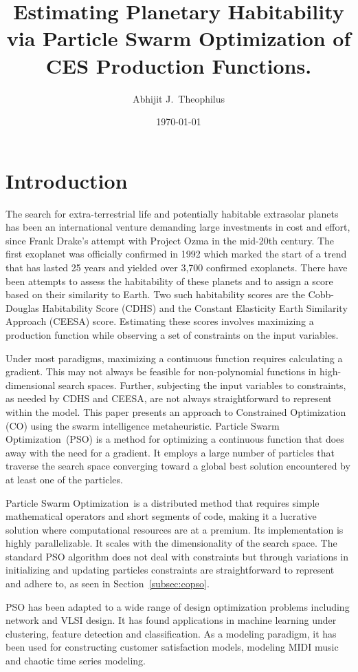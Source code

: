 \documentclass[9pt]{article}
\title{Estimating Planetary Habitability via Particle Swarm Optimization of CES Production Functions.}
\author{Abhijit J.\ Theophilus}
\date{\today}
\newcommand{\pso}{Particle Swarm Optimization}
\begin{document}
\maketitle


\section{Introduction}\label{sec:intro}

The search for extra-terrestrial life and potentially habitable extrasolar planets has been an international venture
demanding large investments in cost and effort, since Frank Drake's attempt with Project Ozma in the mid-20th century.
The first exoplanet was officially confirmed in 1992 which marked the start of a trend that has lasted 25 years and
yielded over 3,700 confirmed exoplanets. There have been attempts to assess the habitability of these planets and to
assign a score based on their similarity to Earth. Two such habitability scores are the Cobb-Douglas Habitability Score
(CDHS) and the Constant Elasticity Earth Similarity Approach (CEESA) score. Estimating these scores involves maximizing
a production function while observing a set of constraints on the input variables.

Under most paradigms, maximizing a continuous function requires calculating a gradient. This may not always be feasible
for non-polynomial functions in high-dimensional search spaces. Further, subjecting the input variables to constraints,
as needed by CDHS and CEESA, are not always straightforward to represent within the model. This paper presents an
approach to Constrained Optimization (CO) using the swarm intelligence metaheuristic. \pso\ (PSO) is a method for
optimizing a continuous function that does away with the need for a gradient. It employs a large number of particles
that traverse the search space converging toward a global best solution encountered by at least one of the particles.

\pso\ is a distributed method that requires simple mathematical operators and short segments of code, making it a
lucrative solution where computational resources are at a premium. Its implementation is highly parallelizable. It
scales with the dimensionality of the search space. The standard PSO algorithm does not deal with constraints but
through variations in initializing and updating particles constraints are straightforward to represent and adhere to, as
seen in Section~\ref{subsec:copso}.

PSO has been adapted to a wide range of design optimization problems including network and VLSI design. It has found
applications in machine learning under clustering, feature detection and classification. As a modeling paradigm, it has
been used for constructing customer satisfaction models, modeling MIDI music and chaotic time series modeling.
\end{document}
